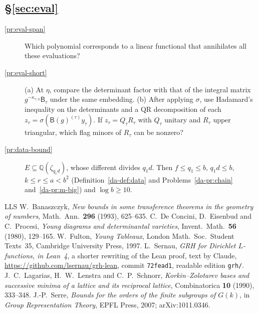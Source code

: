 \documentclass[reqno]{amsart}
\theoremstyle{definition}
\theoremstyle{plain}
\theoremstyle{remark}
\newcommand{\Q}{\mathbb{Q}}
\newcommand{\B}{\mathsf{B}}
\begin{document}
\subsection*{\S\ref{sec:eval}}
\begin{description}
\item[\ref{pr:eval-span}] Which polynomial corresponds to a linear functional that annihilates all these evaluations?
\item[\ref{pr:eval-short}] (a) At \(\eta\), compare the determinant factor with that of the integral matrix \(g^{-\kappa_{\tau,n}}\B_\tau\) under the same embedding.  (b) After applying \(\sigma\), use Hadamard's inequality on the determinants and a QR decomposition of each \(z_\tau=\sigma(\B(g)^{(\tau)}y_\tau)\).  If \(z_\tau=Q_\tau R_\tau\) with \(Q_\tau\) unitary and \(R_\tau\) upper triangular, which flag minors of \(R_\tau\) can be nonzero?
\item[\ref{pr:data-bound}] \(E\subseteq\Q(\zeta_{q_1d})\), whose different divides \(q_1d\).  Then \(f\le q_1\le b\), \(q_1d\le b\), \(k\le r\le a<b^2\) (Definition~\ref{da-def:data} and Problems~\ref{da-pr:chain} and~\ref{da-pr:m-big}) and \(\log b\ge 10\).
\end{description}

\begin{thebibliography}{LLS}
 W.~Banaszczyk, \emph{New bounds in some transference theorems in the geometry of numbers}, Math.\ Ann.\ \textbf{296} (1993), 625--635.
 C.~De Concini, D.~Eisenbud and C.~Procesi, \emph{Young diagrams and determinantal varieties}, Invent.\ Math.\ \textbf{56} (1980), 129--165.
 W.~Fulton, \emph{Young Tableaux}, London Math.\ Soc.\ Student Texts~35, Cambridge University Press, 1997.
 L.~Sernau, \emph{GRH for Dirichlet \(L\)-functions, in Lean~4}, a shorter rewriting of the Lean proof, text by Claude, \url{https://github.com/lsernau/grh-lean}, commit \texttt{72fead1}, readable edition \texttt{grh/}.
 J.~C.~Lagarias, H.~W.~Lenstra and C.~P.~Schnorr, \emph{Korkin--Zolotarev bases and successive minima of a lattice and its reciprocal lattice}, Combinatorica \textbf{10} (1990), 333--348.
 J.-P.~Serre, \emph{Bounds for the orders of the finite subgroups of \(G(k)\)}, in \emph{Group Representation Theory}, EPFL Press, 2007; arXiv:1011.0346.
\end{thebibliography}
\end{document}

